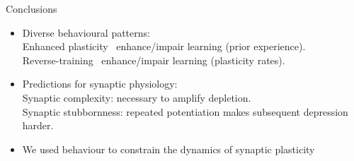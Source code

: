 \documentclass{beamer}%
\begin{document}
\begin{frame}{Conclusions}
%
 \begin{itemize}
   \item Diverse behavioural patterns:\\
   \alert{Enhanced plasticity \lto\ enhance/impair} learning (prior experience).\\
   \alert{Reverse-training \lto\ enhance/impair} learning (plasticity rates).

   \vp\item Predictions for synaptic physiology:\\
   \alert{Synaptic complexity:} necessary to amplify depletion.\\
   \alert{Synaptic stubbornness:} repeated potentiation makes subsequent depression harder.

   \vp\item  We used behaviour to constrain the dynamics of synaptic plasticity
\end{itemize}
%
\end{frame}
\end{document}
